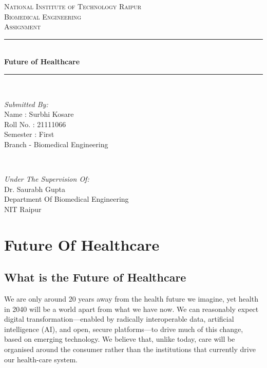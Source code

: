\documentclass[12pt]{article}
\begin{document}
\begin{titlepage}
\newcommand{\HRule}{\rule{\linewidth}{0.5mm}}
\center
\textsc{\LARGE National Institute of Technology Raipur}\\[1.0cm]

\textsc{\Large Biomedical Engineering}\\[0.5cm] 
\textsc{\large Assignment}\\[0.5cm]
\HRule\\[0.4cm]
	
	{\huge\bfseries Future of Healthcare}\\[0.1cm]
	\HRule\\[1.1cm]
	\begin{minipage}{0.4\textwidth}
		\begin{flushleft}
			\large
			\textit{Submitted By:}\\
          		Name : Surbhi Kosare \\
			   Roll No. : 21111066\\
			   Semester : First\\
			   Branch - Biomedical Engineering 
			   
			\end{flushleft}
	\end{minipage}
	~
	\begin{minipage}{0.5\textwidth}
		\begin{flushright}
			\large
			\textit{Under The Supervision Of:}\\
			Dr. Saurabh Gupta\\
			Department Of Biomedical Engineering\\
			NIT Raipur
		\end{flushright}
	\end{minipage}
	\vfill\vfill\vfill 
	
	
	\vfill 
\end{titlepage}

\section{Future Of Healthcare}

\subsection{What is the Future of Healthcare}

We are only around 20 years away from the health future we imagine, yet health in 2040 will be a world apart from what we have now. We can reasonably expect digital transformation—enabled by radically interoperable data, artificial intelligence (AI), and open, secure platforms—to drive much of this change, based on emerging technology. We believe that, unlike today, care will be organised around the consumer rather than the institutions that currently drive our health-care system.
\end{document}

